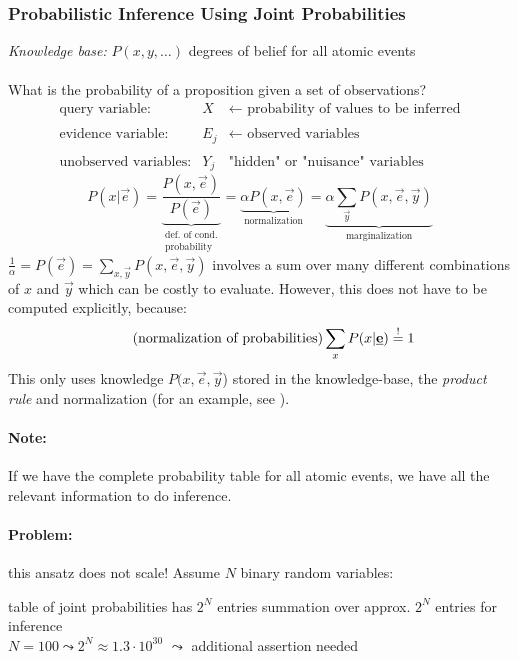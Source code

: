 \subsubsection{Probabilistic Inference Using Joint Probabilities}
\emph{Knowledge base:} $P(x,y,\ldots)$ degrees of belief for all atomic events
\\\\
What is the probability of a proposition given a set of observations?
\[ \begin{array}{lll}
	\text{query variable:}
	& X & \leftarrow \text{ probability of values to be inferred}\\\\
	\text{evidence variable:}
	& E_j & \leftarrow \text{ observed variables} \\\\
	\text{unobserved variables:} 
	& Y_j & \text{"hidden" or "nuisance" variables}
\end{array} \]
\begin{equation}
	P(x | \vec{e}) = \underbrace{ \frac{P(x, \vec{e})}{P(\vec{e})} }_{
		\substack{\text{def. of cond.} \\ \text{probability}}}
		= \underbrace{ \alpha P(x, \vec{e}) }_{\text{normalization}}
		= \underbrace{ \alpha \sum\limits_{\vec{y}} 
			P(x, \vec{e}, \vec{y}) }_{\text{marginalization}}
\end{equation}
$\frac{1}{\alpha} = P(\vec{e}) = \sum\limits_{x,\vec{y}} P(x,\vec{e},\vec{y})$ involves a
sum over many different combinations of $x$ and $\vec{y}$ which can be
costly to evaluate. However, this does not have to be computed explicitly, because:
\begin{equation}		\tag{normalization of probabilities}
	\sum\limits_x P(x|\underline{\mathbf{e}}) \stackrel{\mathrm{!}}{=} 1 
\end{equation}
This only uses knowledge $P(x,\vec{e},\vec{y}$) stored in the
knowledge-base, the \emph{product rule} and normalization
(for an example, see \cite[pp. 475]{RussellNorvig2003}). 

\paragraph{Note:} If we have the complete probability table for all atomic events, we have all the relevant information to do inference. 
\paragraph{Problem:} this ansatz does not scale! Assume $N$ binary random
variables:
\begin{itemize}
	\itl table of joint probabilities has $2^N$ entries
	\itl summation over approx. $2^N$ entries for inference\\ 
		$N = 100 \leadsto 2^N \approx 1.3 \cdot 10^{30}$ 
		$\leadsto$ additional assertion needed
\end{itemize}


